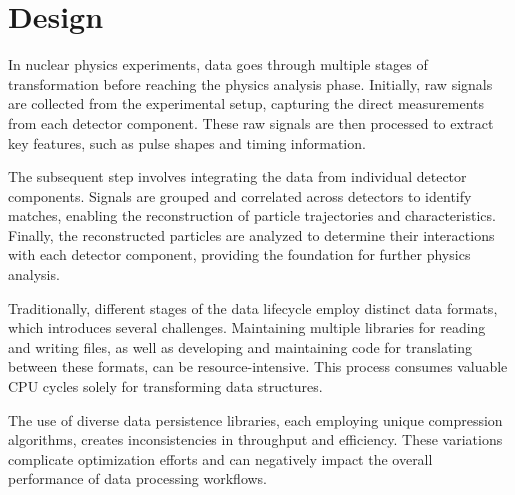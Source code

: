 \section{Design}

In nuclear physics experiments, data goes through multiple stages of transformation before reaching the physics analysis phase. Initially, raw signals are collected from the experimental setup, capturing the direct measurements from each detector component. These raw signals are then processed to extract key features, such as pulse shapes and timing information. 

The subsequent step involves integrating the data from individual detector components. Signals are grouped and correlated across detectors to identify matches, enabling the reconstruction of particle trajectories and characteristics. Finally, the reconstructed particles are analyzed to determine their interactions with each detector component, providing the foundation for further physics analysis.


Traditionally, different stages of the data lifecycle employ distinct data formats, which introduces several challenges. Maintaining multiple libraries for reading and writing files, as well as developing and maintaining code for translating between these formats, can be resource-intensive. This process consumes valuable CPU cycles solely for transforming data structures.

The use of diverse data persistence libraries, each employing unique compression algorithms, creates inconsistencies in throughput and efficiency. These variations complicate optimization efforts and can negatively impact the overall performance of data processing workflows.

